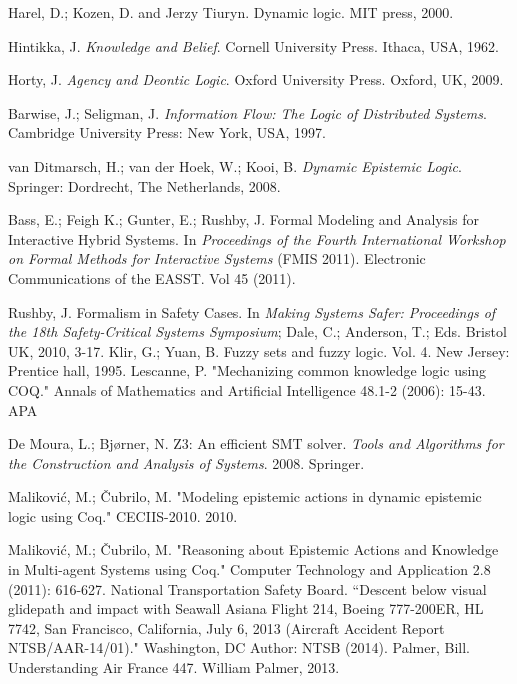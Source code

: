 \begin{thebibliography}{9}
	 	Harel, D.; Kozen, D. and Jerzy Tiuryn. Dynamic logic. MIT press, 2000.
	 	
	 	Hintikka, J. {\em Knowledge and Belief}. Cornell University Press. Ithaca, USA, 1962.
	 	
	 	Horty, J. {\em Agency and Deontic Logic}. Oxford University Press. Oxford, UK, 2009.
	 	
	 	Barwise, J.; Seligman, J. {\em Information Flow: The Logic of Distributed Systems}. Cambridge University Press: New York, USA, 1997.
	 	
	 	van Ditmarsch, H.; van der Hoek, W.; Kooi, B. {\em Dynamic Epistemic Logic}. Springer: Dordrecht, The Netherlands, 2008.
	 	
	 	 Bass, E.; Feigh K.; Gunter, E.; Rushby, J. Formal Modeling and Analysis for Interactive Hybrid Systems. In {\em Proceedings of the Fourth International Workshop on Formal Methods for Interactive Systems} (FMIS 2011). Electronic Communications of the EASST. Vol 45 (2011).
	 	
	 	Rushby, J. Formalism in Safety Cases. In {\em Making Systems Safer: Proceedings of the 18th Safety-Critical Systems Symposium}; Dale, C.; Anderson, T.; Eds. Bristol UK, 2010, 3-17.
	 	Klir, G.; Yuan, B. Fuzzy sets and fuzzy logic. Vol. 4. New Jersey: Prentice hall, 1995.
	 	Lescanne, P. "Mechanizing common knowledge logic using COQ." Annals of Mathematics and Artificial Intelligence 48.1-2 (2006): 15-43.
	 	APA	
	 	
 		 De Moura, L.; Bj{\o}rner, N. Z3: An efficient SMT solver. \emph{Tools and Algorithms for the Construction and Analysis of Systems}. 2008. Springer.
	 	
	 	Malikovi\'c, M.; \v Cubrilo, M. "Modeling epistemic actions in dynamic epistemic logic using Coq." CECIIS-2010. 2010.
	 	
	 	Malikovi\'c, M.; \v Cubrilo, M. "Reasoning about Epistemic Actions and Knowledge in Multi-agent Systems using Coq." Computer Technology and Application 2.8 (2011): 616-627.
	 	National Transportation Safety Board. ``Descent below visual glidepath and impact with Seawall Asiana Flight 214, Boeing 777-200ER, HL 7742, San Francisco, California, July 6, 2013 (Aircraft Accident Report NTSB/AAR-14/01)." Washington, DC Author: NTSB (2014).
	 	Palmer, Bill. Understanding Air France 447. William Palmer, 2013.
	 	

\end{thebibliography}
